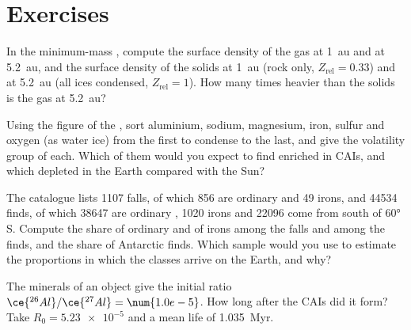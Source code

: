 \section{Exercises}

\begin{exercise}[$\star$]\label{exo:b2:planet-formation-meteorites:1}
In the minimum-mass , compute the surface density of the gas at
\qty{1}{au} and at \qty{5.2}{au}, and the surface density of the solids at
\qty{1}{au} (rock only, $Z_{\mathrm{rel}} = 0.33$) and at \qty{5.2}{au} (all ices
condensed, $Z_{\mathrm{rel}} = 1$). How many times heavier than the solids is the
gas at \qty{5.2}{au}?
\end{exercise}

\begin{exercise}[$\star$]\label{exo:b2:planet-formation-meteorites:2}
Using the figure of the , sort aluminium, sodium,
magnesium, iron, sulfur and oxygen (as water ice) from the first to condense to
the last, and give the volatility group of each. Which of them would you expect
to find enriched in CAIs, and which depleted in the Earth compared with the Sun?
\end{exercise}

\begin{exercise}[$\star$]\label{exo:b2:planet-formation-meteorites:3}
The catalogue lists \num{1107} falls, of which 856 are ordinary  and
49 irons, and \num{44534} finds, of which \num{38647} are ordinary ,
\num{1020} irons and \num{22096} come from south of \ang{60}\,S. Compute the
share of ordinary  and of irons among the falls and among the finds,
and the share of Antarctic finds. Which sample would you use to estimate the
proportions in which the classes arrive on the Earth, and why?
\end{exercise}

\begin{exercise}[$\star$]\label{exo:b2:planet-formation-meteorites:4}
The minerals of an object give the initial ratio
$\ce{^{26}Al}/\ce{^{27}Al} = \num{1.0e-5}$. How long after the CAIs did it form?
Take $R_0 = \num{5.23e-5}$ and a mean life of \qty{1.035}{Myr}.
\end{exercise}

